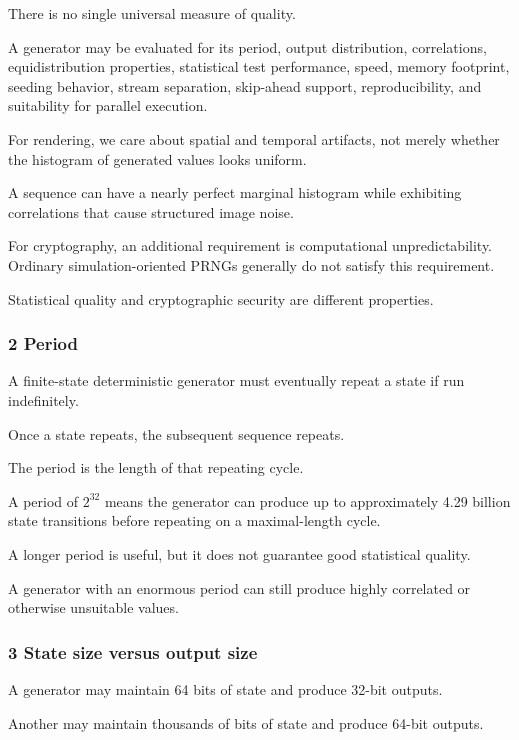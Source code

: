 There is no single universal measure of quality.

A generator may be evaluated for its period, output distribution, correlations, equidistribution properties, statistical test performance, speed, memory footprint, seeding behavior, stream separation, skip-ahead support, reproducibility, and suitability for parallel execution.

For rendering, we care about spatial and temporal artifacts, not merely whether the histogram of generated values looks uniform.

A sequence can have a nearly perfect marginal histogram while exhibiting correlations that cause structured image noise.

For cryptography, an additional requirement is computational unpredictability. Ordinary simulation-oriented PRNGs generally do not satisfy this requirement.

Statistical quality and cryptographic security are different properties.

\subsubsection{2 Period}\label{02-foundations-ii-ch029-period}

A finite-state deterministic generator must eventually repeat a state if run indefinitely.

Once a state repeats, the subsequent sequence repeats.

The period is the length of that repeating cycle.

A period of \(2^{32}\) means the generator can produce up to approximately 4.29 billion state transitions before repeating on a maximal-length cycle.

A longer period is useful, but it does not guarantee good statistical quality.

A generator with an enormous period can still produce highly correlated or otherwise unsuitable values.

\subsubsection{3 State size versus output size}\label{02-foundations-ii-ch029-state-size-versus-output-size}

A generator may maintain 64 bits of state and produce 32-bit outputs.

Another may maintain thousands of bits of state and produce 64-bit outputs.

